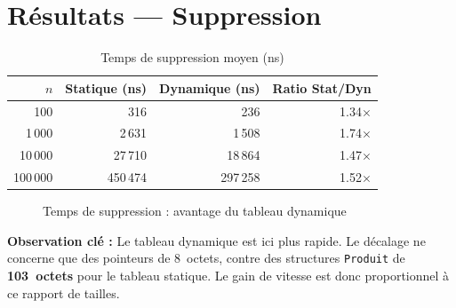 \documentclass[12pt,a4paper]{report}
\begin{document}
\section{Résultats — Suppression}

\begin{table}[H]
\centering
\caption{Temps de suppression moyen (ns)}
\label{tab:suppression}
\renewcommand{\arraystretch}{1.2}
\begin{tabular}{rrrr}
\toprule
$n$ & Statique (ns) & Dynamique (ns) & Ratio Stat/Dyn \\
\midrule
100       &     316  &     236  & 1.34$\times$ \\
1\,000    &   2\,631 &   1\,508 & 1.74$\times$ \\
10\,000   &  27\,710 &  18\,864 & 1.47$\times$ \\
100\,000  & 450\,474 & 297\,258 & 1.52$\times$ \\
\bottomrule
\end{tabular}
\end{table}

\begin{figure}[H]
\centering
{}
\caption{Temps de suppression : avantage du tableau dynamique}
\label{fig:suppression}
\end{figure}

\begin{boiteResultat}
\textbf{Observation clé :} Le tableau dynamique est ici plus rapide. Le décalage ne concerne que des pointeurs de 8~octets, contre des structures \texttt{Produit} de \textbf{103~octets} pour le tableau statique. Le gain de vitesse est donc proportionnel à ce rapport de tailles.
\end{boiteResultat}
\end{document}
